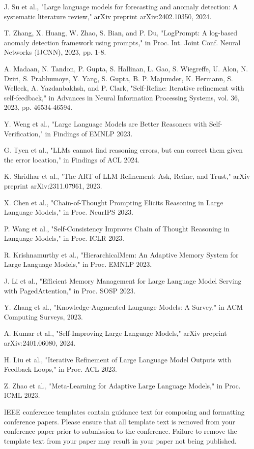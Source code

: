 \documentclass[conference]{IEEEtran}
\begin{document}
\begin{thebibliography}{00}
 J. Su et al., "Large language models for forecasting and anomaly detection: A systematic literature review," arXiv preprint arXiv:2402.10350, 2024.

 T. Zhang, X. Huang, W. Zhao, S. Bian, and P. Du, "LogPrompt: A log-based anomaly detection framework using prompts," in Proc. Int. Joint Conf. Neural Networks (IJCNN), 2023, pp. 1-8.

 A. Madaan, N. Tandon, P. Gupta, S. Hallinan, L. Gao, S. Wiegreffe, U. Alon, N. Dziri, S. Prabhumoye, Y. Yang, S. Gupta, B. P. Majumder, K. Hermann, S. Welleck, A. Yazdanbakhsh, and P. Clark, "Self-Refine: Iterative refinement with self-feedback," in Advances in Neural Information Processing Systems, vol. 36, 2023, pp. 46534-46594.

 Y. Weng et al., "Large Language Models are Better Reasoners with Self-Verification," in Findings of EMNLP 2023.

 G. Tyen et al., "LLMs cannot find reasoning errors, but can correct them given the error location," in Findings of ACL 2024.

 K. Shridhar et al., "The ART of LLM Refinement: Ask, Refine, and Trust," arXiv preprint arXiv:2311.07961, 2023.

 X. Chen et al., "Chain-of-Thought Prompting Elicits Reasoning in Large Language Models," in Proc. NeurIPS 2023.

 P. Wang et al., "Self-Consistency Improves Chain of Thought Reasoning in Language Models," in Proc. ICLR 2023.

 R. Krishnamurthy et al., "HierarchicalMem: An Adaptive Memory System for Large Language Models," in Proc. EMNLP 2023.

 J. Li et al., "Efficient Memory Management for Large Language Model Serving with PagedAttention," in Proc. SOSP 2023.

 Y. Zhang et al., "Knowledge-Augmented Language Models: A Survey," in ACM Computing Surveys, 2023.

 A. Kumar et al., "Self-Improving Large Language Models," arXiv preprint arXiv:2401.06080, 2024.

 H. Liu et al., "Iterative Refinement of Large Language Model Outputs with Feedback Loops," in Proc. ACL 2023.

 Z. Zhao et al., "Meta-Learning for Adaptive Large Language Models," in Proc. ICML 2023.
\end{thebibliography}
\vspace{12pt}
\color{red}
IEEE conference templates contain guidance text for composing and formatting conference papers. Please ensure that all template text is removed from your conference paper prior to submission to the conference. Failure to remove the template text from your paper may result in your paper not being published.
\end{document}
